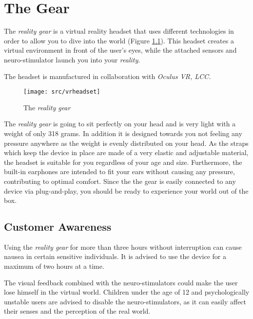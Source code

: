 \chapter{The Gear}

The \emph{\poke{} reality gear} is a virtual reality headset that uses different technologies in order to allow you to dive into the \poke{} world (Figure \ref{headset}). This headset creates a virtual environment in front of the user's eyes, while the attached sensors and neuro-stimulator launch you into  your \emph{\poke{} reality}.\medskip

The headset is manufactured in collaboration with \emph{Oculus VR, LCC.}

\begin{figure}[!ht]
\begin{center}
\texttt{[image: src/vrheadset]}
\end{center}
\caption[The \emph{\pokeT{} reality gear}]{The \emph{\poke{} reality gear}}
\label{headset}
\end{figure}

The \emph{\poke{} reality gear} is going to sit perfectly on your head and is very light with a weight of only 318 grams. In addition it is designed towards you not feeling any pressure anywhere as the weight is evenly distributed on your head. As the straps which keep the device in place are made of a very elastic and adjustable material, the headset is suitable for you regardless of your age and size. Furthermore, the built-in earphones are  intended to fit your ears without causing any pressure, contributing to optimal comfort. Since the the gear is easily connected to any device via plug-and-play, you should be ready to experience your \poke{} world out of the box.

\section{Customer Awareness}

Using the \emph{\poke{} reality gear} for more than three hours without interruption can cause nausea in certain sensitive individuals. It is advised to use the device for a maximum of two hours at a time. 

The visual feedback combined with the neuro-stimulators could make the user lose himself in the virtual world. Children under the age of 12 and psychologically unstable users are advised to disable the neuro-stimulators, as it can easily affect their senses and the perception of the real world. 

